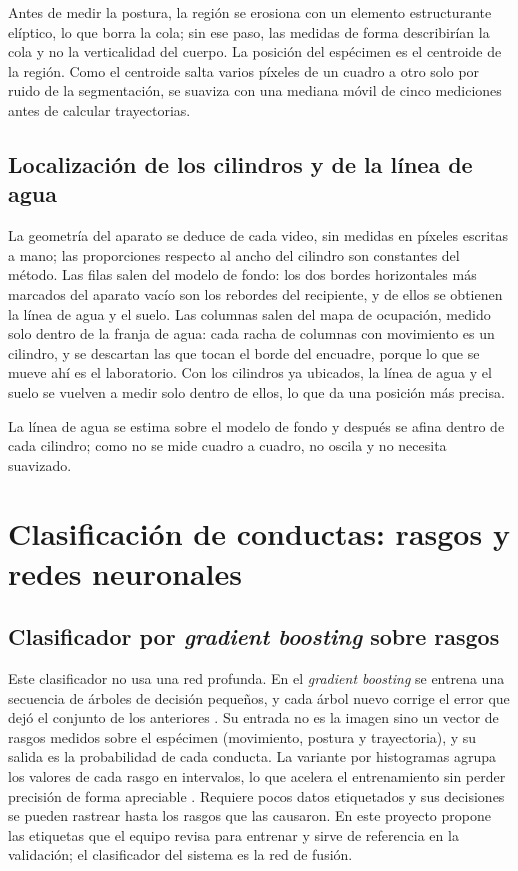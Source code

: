 Antes de medir la postura, la región se erosiona con un elemento estructurante elíptico,
lo que borra la cola; sin ese paso, las medidas de forma describirían la cola y no la
verticalidad del cuerpo. La posición del espécimen es el centroide de la región. Como el
centroide salta varios píxeles de un cuadro a otro solo por ruido de la segmentación, se
suaviza con una mediana móvil de cinco mediciones antes de calcular trayectorias.

\subsection{Localización de los cilindros y de la línea de agua}

La geometría del aparato se deduce de cada video, sin medidas en píxeles escritas a mano; las proporciones respecto al ancho del cilindro son constantes del método. Las filas
salen del modelo de fondo: los dos bordes horizontales más marcados del aparato vacío son
los rebordes del recipiente, y de ellos se obtienen la línea de agua y el suelo. Las
columnas salen del mapa de ocupación, medido solo dentro de la franja de agua: cada racha
de columnas con movimiento es un cilindro, y se descartan las que tocan el borde del
encuadre, porque lo que se mueve ahí es el laboratorio. Con los cilindros ya ubicados, la
línea de agua y el suelo se vuelven a medir solo dentro de ellos, lo que da una posición
más precisa.

La línea de agua se estima sobre el modelo de fondo y después se afina dentro de cada cilindro; como no se mide cuadro
a cuadro, no oscila y no necesita suavizado.

\section{Clasificación de conductas: rasgos y redes neuronales}

\subsection{Clasificador por \textit{gradient boosting} sobre rasgos}

Este clasificador no usa una red profunda. En el
\textit{gradient boosting} se entrena una secuencia de árboles de decisión
pequeños, y cada árbol nuevo corrige el error que dejó el conjunto de los anteriores
\cite{friedman2001}. Su entrada no es la imagen sino un vector de rasgos medidos sobre
el espécimen (movimiento, postura y trayectoria), y su salida es la probabilidad de
cada conducta. La variante por histogramas agrupa los valores de cada rasgo en
intervalos, lo que acelera el entrenamiento sin perder precisión de forma apreciable
\cite{ke2017,pedregosa2011}. Requiere pocos datos etiquetados y sus decisiones se
pueden rastrear hasta los rasgos que las causaron. En este proyecto propone las etiquetas que el equipo revisa para entrenar y sirve de referencia en la validación; el clasificador del sistema es la red de fusión.

